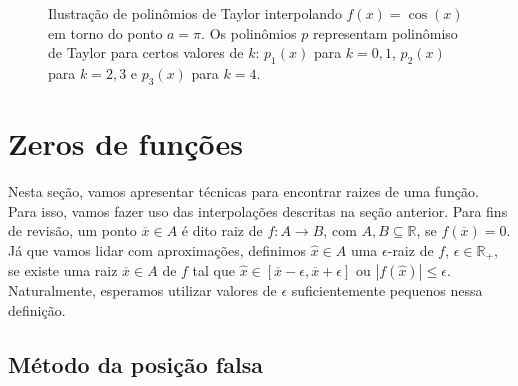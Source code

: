 \documentclass[]{article}
\numberwithin{equation}{section}
\begin{document}
\begin{figure}
  \centering
  \caption{Ilustração de polinômios de Taylor interpolando
    $f(x) =\cos(x)$ em torno do ponto $a = \pi$.  Os polinômios $p$
    representam polinômiso de Taylor para certos valores de $k$:
    $p_1(x)$ para $k = 0, 1$, $p_2(x)$ para $k = 2, 3$ e $p_3(x)$ para
    $k = 4$.}
\end{figure}

\section{Zeros de funções}

Nesta seção, vamos apresentar técnicas para encontrar raizes de uma função. Para isso, vamos fazer uso das interpolações descritas na seção anterior. Para fins de revisão, um ponto $\overline{x} \in A$ é dito raiz de $f : A \to B$, com $A, B \subseteq \mathbb{R}$, se $f(\overline{x}) = 0$. Já que vamos lidar com aproximações, definimos $\hat{x} \in A$ uma $\epsilon$-raiz de $f$, $\epsilon \in \mathbb{R}_+$, se existe uma raiz $\overline{x} \in A$ de $f$ tal que $\hat{x} \in [\overline{x} - \epsilon, \overline{x} + \epsilon]$ ou $|f(\hat{x})| \leq \epsilon$. Naturalmente, esperamos utilizar valores de $\epsilon$ suficientemente pequenos nessa definição.

\subsection{Método da posição falsa}
\end{document}
